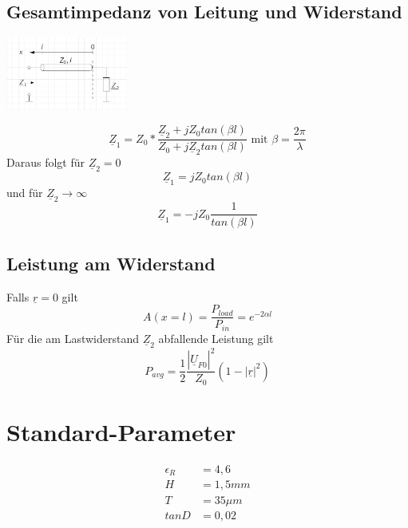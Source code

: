 \documentclass[11pt]{scrartcl}
\def\Uc{\underline{\hat U}}
\begin{document}
\subsection{Gesamtimpedanz von Leitung und Widerstand}
\begin{center}
	\includegraphics[width=0.3\textwidth]{Grafiken/02_Leitungsimpedanz.png}
\end{center}
\begin{equation*}
	\underline{Z}_1 = Z_0*\frac{\underline{Z}_2+jZ_0tan(\beta l)}{Z_0+j\underline{Z}_2tan(\beta l)} \text{ mit } \beta = \frac{2\pi}{\lambda}
\end{equation*}
Daraus folgt für $\underline{Z}_2 = 0$
\begin{equation*}
	\underline{Z}_1 = jZ_0tan(\beta l)
\end{equation*}
und für $\underline{Z}_2\rightarrow\infty$
\begin{equation*}
	\underline{Z}_1 = -jZ_0\frac{1}{tan(\beta l)}
\end{equation*}
\subsection{Leistung am Widerstand}
Falls $\underline{r} = 0$ gilt
\begin{equation*}
	A(x=l) = \frac{P_{load}}{P_{in}} = e^{-2\alpha l}
\end{equation*}
 Für die am Lastwiderstand $\underline{Z}_2$ abfallende Leistung gilt
 \begin{equation*}
 	P_{avg} = \frac{1}{2}\frac{|\Uc_{F0}|^2}{Z_0}(1-|\underline{r}|^2)
 \end{equation*}
 \section{Standard-Parameter}
 \begin{align*}
 	\epsilon_R&=4,6 \\
 	H&=1,5mm\\
 	T&=35\mu m\\
 	tanD&=0,02
 \end{align*}
\end{document}
